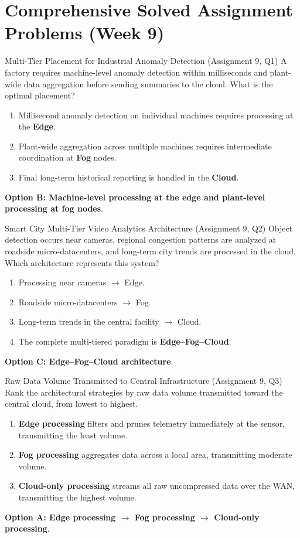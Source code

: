 \section{Comprehensive Solved Assignment Problems (Week 9)}

\begin{solved}{Multi-Tier Placement for Industrial Anomaly Detection (Assignment 9, Q1)}
\Given A factory requires machine-level anomaly detection within milliseconds and plant-wide data aggregation before sending summaries to the cloud. What is the optimal placement?
\Steps
\begin{enumerate}[leftmargin=*]
  \item Millisecond anomaly detection on individual machines requires processing at the \textbf{Edge}.
  \item Plant-wide aggregation across multiple machines requires intermediate coordination at \textbf{Fog} nodes.
  \item Final long-term historical reporting is handled in the \textbf{Cloud}.
\end{enumerate}
\Answer \textbf{Option B: Machine-level processing at the edge and plant-level processing at fog nodes}.
\end{solved}

\begin{solved}{Smart City Multi-Tier Video Analytics Architecture (Assignment 9, Q2)}
\Given Object detection occurs near cameras, regional congestion patterns are analyzed at roadside micro-datacenters, and long-term city trends are processed in the cloud. Which architecture represents this system?
\Steps
\begin{enumerate}[leftmargin=*]
  \item Processing near cameras $\to$ Edge.
  \item Roadside micro-datacenters $\to$ Fog.
  \item Long-term trends in the central facility $\to$ Cloud.
  \item The complete multi-tiered paradigm is \textbf{Edge--Fog--Cloud}.
\end{enumerate}
\Answer \textbf{Option C: Edge--Fog--Cloud architecture}.
\end{solved}

\begin{solved}{Raw Data Volume Transmitted to Central Infrastructure (Assignment 9, Q3)}
\Given Rank the architectural strategies by raw data volume transmitted toward the central cloud, from lowest to highest.
\Steps
\begin{enumerate}[leftmargin=*]
  \item \textbf{Edge processing} filters and prunes telemetry immediately at the sensor, transmitting the least volume.
  \item \textbf{Fog processing} aggregates data across a local area, transmitting moderate volume.
  \item \textbf{Cloud-only processing} streams all raw uncompressed data over the WAN, transmitting the highest volume.
\end{enumerate}
\Answer \textbf{Option A: Edge processing $\to$ Fog processing $\to$ Cloud-only processing}.
\end{solved}

